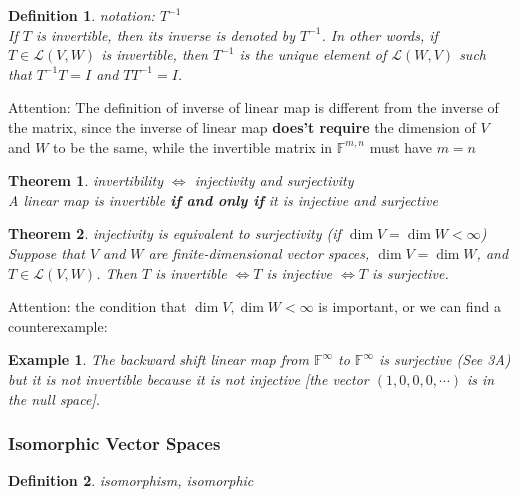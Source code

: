 \documentclass{article}
\newtheorem{theorem}{Theorem}[subsection]
\newtheorem{example}{Example}[subsection]
\newtheorem{definition}{Definition}[subsection]
\newcommand{\FF}{\mathbb{F}}
\begin{document}
\begin{CJK}{UTF8}{gkai}
\begin{definition}
    notation: $T^{-1}$\\

    If $T$ is invertible, then its inverse is denoted by $T^{-1}$. In other words, if $T \in \mathcal{L}(V,W)$ is invertible, then $T^{-1}$ is the unique element of $\mathcal{L}(W,V)$ such that $T^{-1}T = I$ and $TT^{-1} = I$.\\
\end{definition}

Attention: The definition of inverse of linear map is different from the inverse of the matrix, since the inverse of linear map \textbf{does't require} the dimension of $V$ and $W$ to be the same, while the invertible matrix in $\FF^{m,n}$ must have $ m = n$\\  

\begin{theorem}
    invertibility $\Leftrightarrow$ injectivity and surjectivity\\

    A linear map is invertible \textbf{if and only if} it is injective and surjective\\
\end{theorem}

\begin{theorem}
    injectivity is equivalent to surjectivity (if $\dim V = \dim W < \infty$)\\

    Suppose that $V$ and $W$ are finite-dimensional vector spaces, $\dim V = \dim W$, and $T \in \mathcal{L}(V,W)$. Then $T$ is invertible $\Leftrightarrow T$ is injective $\Leftrightarrow T$ is surjective.\\
\end{theorem}

Attention: the condition that $\dim V , \dim W < \infty$ is important, or we can find a counterexample:\\

\begin{example}
    
    The backward shift linear map from $\FF^\infty$ to $\FF^\infty$ is surjective (See 3A) but it is not invertible because it is not injective [the vector $(1,0,0,0,\cdots)$ is in the null space].\\
    
\end{example}


\subsubsection{Isomorphic Vector Spaces}
\begin{definition}
    isomorphism, isomorphic\\


\end{definition}
\end{CJK}
\end{document}
